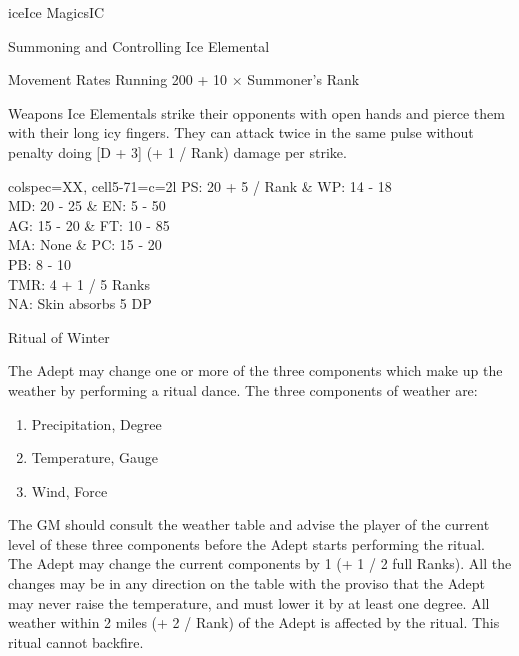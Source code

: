 \begin{College}[1.5]{ice}{Ice Magics}{IC}
\begin{ritual}[R-2]{Summoning and Controlling Ice Elemental}
\begin{effects}
\begin{Description}
\item[Movement Rates] Running 200 + 10 × Summoner’s Rank

\item[Weapons] Ice Elementals strike their opponents with open hands
  and pierce them with their long icy fingers. They can attack twice
  in the same pulse without penalty doing [D + 3] (+ 1 / Rank) damage
  per strike.
\end{Description}

\begin{dqtblr}{colspec={XX},
    cell{5-7}{1}={c=2}{l}}
PS: 20 + 5 / Rank	& WP: 14 - 18 \\
MD: 20 - 25		& EN: 5 - 50 \\
AG: 15 - 20		& FT: 10 - 85 \\
MA: None		& PC: 15 - 20 \\
PB: 8 - 10		\\
TMR: 4 + 1 / 5 Ranks	\\
NA: Skin absorbs 5 DP	\\
\end{dqtblr}
\end{effects}
\end{ritual}

\begin{ritual}[R-3]{Ritual of Winter}

\begin{effects}
The Adept may change one or more of the three components which make up
the weather by performing a ritual dance. The three components of
weather are:
\begin{enumerate}
\item Precipitation, Degree 
\item Temperature, Gauge 
\item Wind, Force 
\end{enumerate}

The GM should consult the weather table and advise the player of the
current level of these three components before the Adept starts
performing the ritual.  The Adept may change the current components by
1 (+ 1 / 2 full Ranks).  All the changes may be in any direction on
the table with the proviso that the Adept may never raise the
temperature, and must lower it by at least one degree.  All weather
within 2 miles (+ 2 / Rank) of the Adept is affected by the
ritual. This ritual cannot backfire.
\end{effects}
\end{ritual}


\end{College}
